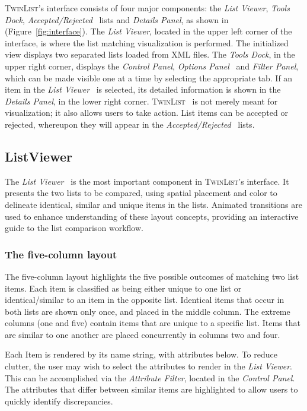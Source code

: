 \documentclass{chi2009}
\newcommand{\TwinList}{\textsc{TwinList}}
\newcommand{\ListViewer}{\textit{List Viewer}}
\newcommand{\AcceptedRejected}{\textit{Accepted/Rejected}}
\newcommand{\Details}{\textit{Details Panel}}
\newcommand{\Tools}{\textit{Tools Dock}}
\newcommand{\Controls}{\textit{Control Panel}}
\newcommand{\Filters}{\textit{Filter Panel}}
\newcommand{\Options}{\textit{Options Panel}}
\newcommand{\AttributeFilter}{\textit{Attribute Filter}}
\begin{document}
\TwinList's interface consists of four major components: the \ListViewer, \Tools, \AcceptedRejected~ lists and \Details, as shown in (Figure~\ref{fig:interface}). The \ListViewer, located in the upper left corner of the interface, is where the list matching visualization is performed. The initialized view displays two separated lists loaded from XML files. The \Tools, in the upper right corner, displays the \Controls, \Options~ and \Filters, which can be made visible one at a time by selecting the appropriate tab. If an item in the \ListViewer~ is selected, its detailed information is shown in the \Details, in the lower right corner. \TwinList~ is not merely meant for visualization; it also allows users to take action. List items can be accepted or rejected, whereupon they will appear in the \AcceptedRejected~ lists.

\subsection{ListViewer}
The  \ListViewer~ is the most important component in \TwinList's interface. It presents the two lists to be compared, using spatial placement and color to delineate identical, similar and unique items in the lists. Animated transitions are used to enhance understanding of these layout concepts, providing an interactive guide to the list comparison workflow.

\subsubsection{The five-column layout}
The five-column layout highlights the five possible outcomes of matching two list items. Each item is classified as being either unique to one list or identical/similar to an item in the opposite list. Identical items that occur in both lists are shown only once, and placed in the middle column. The extreme columns (one and five) contain items that are unique to a specific list. Items that are similar to one another are placed concurrently in columns two and four.

Each Item is rendered by its name string, with attributes below. To reduce clutter, the user may wish to select the attributes to render in the \ListViewer. This can be accomplished via the \AttributeFilter, located in the \Controls. The attributes that differ between similar items are highlighted to allow users to quickly identify discrepancies.
\end{document}
